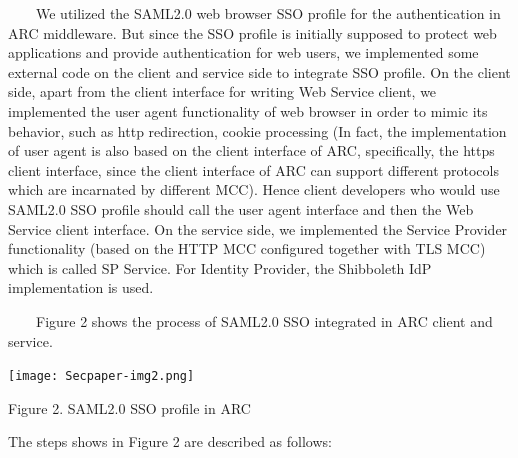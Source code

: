 \documentclass{article}
\begin{document}
\ \ \ \ We utilized the SAML2.0 web browser SSO profile for the
authentication in ARC middleware. But since the SSO profile is
initially supposed to protect web applications and provide
authentication for web users, we implemented some external code on the
client and service side to integrate SSO profile. On the client side,
apart from the client interface for writing Web Service client, we
implemented the user agent functionality of web browser in order to
mimic its behavior, such as http redirection, cookie processing (In
fact, the implementation of user agent is also based on the client
interface of ARC, specifically, the https client interface, since the
client interface of ARC can support different protocols which are
incarnated by different MCC). Hence client developers who would use
SAML2.0 SSO profile should call the user agent interface and then the
Web Service client interface. On the service side, we implemented the
Service Provider functionality (based on the HTTP MCC configured
together with TLS MCC) which is called SP Service. For Identity
Provider, the Shibboleth IdP implementation is used.

\ \ \ \ Figure 2 shows the process of SAML2.0 SSO integrated in ARC
client and service.


\bigskip



\begin{center}
\texttt{[image: Secpaper-img2.png]}
\end{center}
{\centering
Figure 2. SAML2.0 SSO profile in ARC
\par}

The steps shows in Figure 2 are described as follows:
\end{document}
